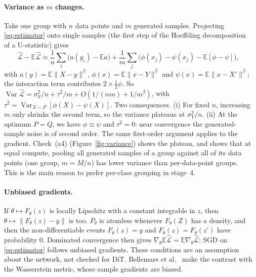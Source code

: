 \documentclass[11pt]{article}
\theoremstyle{definition}
\theoremstyle{remark}
\newcommand{\E}{\mathbb{E}}
\newcommand{\norm}[1]{\lVert #1\rVert}
\begin{document}
\paragraph{Variance as $m$ changes.} Take one group with $n$ data points and $m$ generated samples.
Projecting \eqref{eq:estimator} onto single samples (the first step of the Hoeffding decomposition of a
U-statistic) gives
\[
\widehat{\mathcal L}-\E\widehat{\mathcal L}\approx\frac1n\sum_i\big(a(y_i)-\E a\big)+\frac1m\sum_j\big(\phi(x_j)-\psi(x_j)-\E[\phi-\psi]\big),
\]
with $a(y)=\E\norm{X-y}^\beta$, $\phi(x)=\E\norm{x-Y}^\beta$ and $\psi(x)=\E\norm{x-X'}^\beta$; the
interaction term contributes $2\times\tfrac12\psi$. So
$\operatorname{Var}\widehat{\mathcal L}=\sigma_Y^2/n+\tau^2/m+O(1/(nm)+1/m^2)$, with
$\tau^2=\operatorname{Var}_{X\sim P}[\phi(X)-\psi(X)]$. Two consequences. (i) For fixed $n$, increasing $m$
only shrinks the second term, so the variance plateaus at $\sigma_Y^2/n$. (ii) At the optimum $P=Q$, we
have $\phi\equiv\psi$ and $\tau^2=0$: near convergence the generated-sample noise is of second order. The same
first-order argument applies to the gradient. Check~(a4) (Figure~\ref{fig:variance}) shows the plateau, and
shows that at equal compute, pooling all generated samples of a group against all of its data points (one
group, $m=M/n$) has lower variance than per-data-point groups. This is the main reason to prefer
per-class grouping in stage~4.

\paragraph{Unbiased gradients.} If $\theta\mapsto F_\theta(z)$ is locally Lipschitz with a constant
integrable in $z$, then $\theta\mapsto\norm{F_\theta(z)-y}$ is too. $P_\theta$ is atomless whenever
$F_\theta(Z)$ has a density, and then the non-differentiable events $F_\theta(z)=y$ and
$F_\theta(z)=F_\theta(z')$ have probability $0$. Dominated convergence then gives
$\nabla_\theta\E\widehat{\mathcal L}=\E\nabla_\theta\widehat{\mathcal L}$: SGD on \eqref{eq:estimator} follows
unbiased gradients. These conditions are an assumption about the network, not checked for DiT. Bellemare
et al.~\cite{Bellemare2017} make the contrast with the Wasserstein metric, whose sample gradients are biased.
\end{document}
